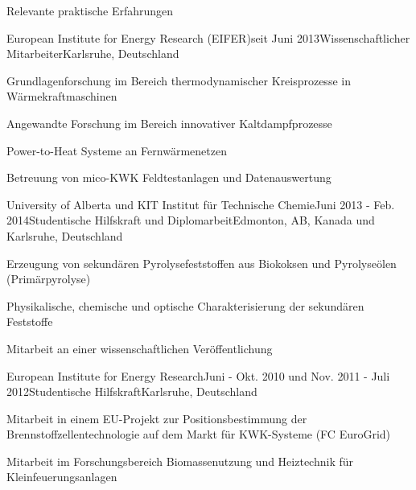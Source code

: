 \documentclass{resume}
\begin{document}

\begin{rSection}{Relevante praktische Erfahrungen}

\begin{rSubsection}{European Institute for Energy Research (EIFER)}{seit Juni
2013}{Wissenschaftlicher Mitarbeiter}{Karlsruhe, Deutschland}
\item Grundlagenforschung im Bereich thermodynamischer Kreisprozesse in
Wärmekraftmaschinen
\item Angewandte Forschung im Bereich innovativer Kaltdampfprozesse 
\item Power-to-Heat Systeme an Fernwärmenetzen
\item Betreuung von mico-KWK Feldtestanlagen und Datenauswertung
\end{rSubsection}


\begin{rSubsection}{University of Alberta und KIT Institut für
Technische Chemie}{Juni 2013 - Feb. 2014}{Studentische
Hilfskraft und Diplomarbeit}{Edmonton, AB, Kanada und Karlsruhe, Deutschland}
\item Erzeugung von sekundären Pyrolysefeststoffen aus Biokoksen und
Pyrolyseölen (Primärpyrolyse)
\item Physikalische, chemische und optische Charakterisierung der sekundären
Feststoffe
\item Mitarbeit an einer wissenschaftlichen Veröffentlichung
\end{rSubsection}


\begin{rSubsection}{European Institute for Energy Research}{Juni -
Okt. 2010 und Nov. 2011 - Juli 2012}{Studentische
Hilfskraft}{Karlsruhe, Deutschland}
\item Mitarbeit in einem EU-Projekt zur Positionsbestimmung der
Brennstoffzellentechnologie  auf dem Markt für KWK-Systeme (FC EuroGrid)
\item Mitarbeit im Forschungsbereich Biomassenutzung und Heiztechnik für 
Kleinfeuerungsanlagen
\end{rSubsection}



\end{rSection}
\end{document}
